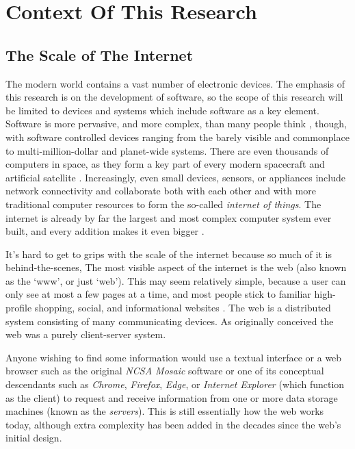 \chapter{Context Of This Research}
\label{chapter:context}

\section{The Scale of The Internet}
\label{section:context scale}

The modern world contains a vast number of electronic devices. The emphasis of this research is on the development of software, so the scope of this research will be limited to devices and systems which include software as a key element. Software is more pervasive, and more complex, than many people think \citep{Kang2015}, though, with software controlled devices ranging from the barely visible and commonplace to multi-million-dollar and planet-wide systems. There are even thousands of computers in space, as they form a key part of every modern spacecraft and artificial satellite \citep{Eickhoff2011}. Increasingly, even small devices, sensors, or appliances include network connectivity and collaborate both with each other and with more traditional computer resources to form the so-called \emph{internet of things}. The internet is already by far the largest and most complex computer system ever built, and every addition makes it even bigger \citep{Belkhir2018}. 

It's hard to get to grips with the scale of the \gls{internet} because so much of it is behind-the-scenes, The most visible aspect of the internet is the \gls{web} (also known as the `www', or just `web'). This may seem relatively simple, because a user can only see at most a few pages at a time, and most people stick to familiar high-profile shopping, social, and informational websites \citep{Similarweb2023}. The web is a \gls{distributed system} consisting of many communicating devices. As originally conceived \citep{Berners-Lee1992} the web was a purely \gls{client-server} system.

Anyone wishing to find some information would use a textual interface or a \gls{web browser} such as the original \emph{NCSA Mosaic} software \citep{Strawn2014} or one of its conceptual descendants such as \emph{Chrome}, \emph{Firefox}, \emph{Edge}, or \emph{Internet Explorer} (which function as the \gls{client}) to request and receive information from one or more data storage machines (known as the \emph{servers}). This is still essentially how the web works today, although extra complexity has been added in the decades since the web's initial design.

